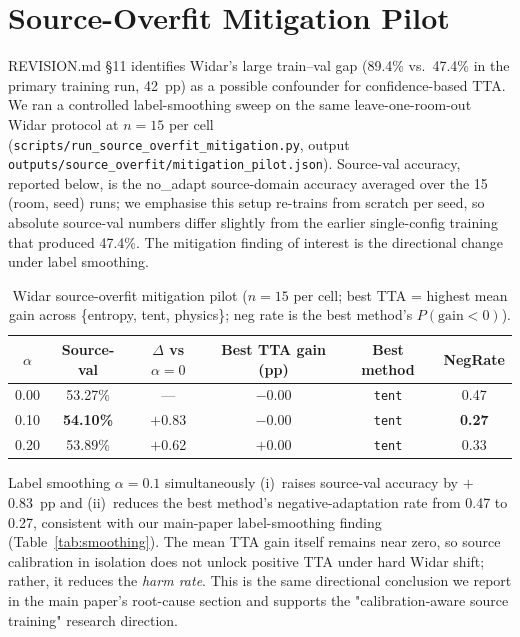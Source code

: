 \section{Source-Overfit Mitigation Pilot}
\label{app:source_overfit}

REVISION.md \S11 identifies Widar's large train--val gap (89.4\% vs.\ 47.4\% in the primary training run, 42~pp) as a possible confounder for confidence-based TTA. We ran a controlled label-smoothing sweep on the same leave-one-room-out Widar protocol at $n{=}15$ per cell (\texttt{scripts/run\_source\_overfit\_mitigation.py}, output \texttt{outputs/source\_overfit/mitigation\_pilot.json}). Source-val accuracy, reported below, is the no\_adapt source-domain accuracy averaged over the 15 (room, seed) runs; we emphasise this setup re-trains from scratch per seed, so absolute source-val numbers differ slightly from the earlier single-config training that produced 47.4\%. The mitigation finding of interest is the directional change under label smoothing.

\begin{table}[h]
\centering
\caption{Widar source-overfit mitigation pilot ($n{=}15$ per cell; best TTA = highest mean gain across \{entropy, tent, physics\}; neg rate is the best method's $P(\text{gain}<0)$).}
\label{tab:source_overfit}
\small
\begin{tabular}{cccccc}
\toprule
$\alpha$ & \textbf{Source-val} & \textbf{$\Delta$ vs $\alpha{=}0$} & \textbf{Best TTA gain (pp)} & \textbf{Best method} & \textbf{NegRate} \\
\midrule
0.00 & 53.27\% & --- & $-$0.00 & \texttt{tent} & 0.47 \\
0.10 & \textbf{54.10\%} & $+$0.83 & $-$0.00 & \texttt{tent} & \textbf{0.27} \\
0.20 & 53.89\% & $+$0.62 & $+$0.00 & \texttt{tent} & 0.33 \\
\bottomrule
\end{tabular}
\end{table}

Label smoothing $\alpha{=}0.1$ simultaneously (i)~raises source-val accuracy by $+$0.83~pp and (ii)~reduces the best method's negative-adaptation rate from 0.47 to 0.27, consistent with our main-paper label-smoothing finding (Table~\ref{tab:smoothing}). The mean TTA gain itself remains near zero, so source calibration in isolation does not unlock positive TTA under hard Widar shift; rather, it reduces the \emph{harm rate}. This is the same directional conclusion we report in the main paper's root-cause section and supports the "calibration-aware source training" research direction.


